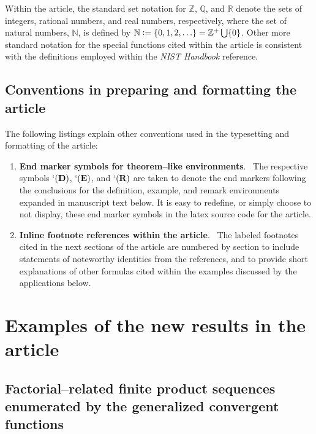 \documentclass[12pt,reqno]{article}
\numberwithin{sfootnote}{section}
\numberwithin{equation}{section}
\renewcommand{\labelenumi}{\textbf{\arabic{enumi}.}}
\renewcommand{\labelenumi}{$\mathsmaller{\blacktriangleright}$ }
\theoremstyle{DefaultTheoremStyle}
\theoremstyle{definition}
\newcommand{\DefinitionQEDSymbol}{`(\text{\rm{\bf D}})}
\newcommand{\RemarkQEDSymbol}{`(\text{\rm{\bf R}})}
\newcommand{\ExampleQEDSymbol}{`(\text{\rm{\bf E}})}
\newcommand{\defequals}{\ensuremath{\vcentcolon=}}
\begin{document}
Within the article, the standard set notation for 
$\mathbb{Z}$, $\mathbb{Q}$, and $\mathbb{R}$ 
denote the sets of integers, rational numbers, and real numbers, respectively, 
where the set of natural numbers, $\mathbb{N}$, is defined by 
$\mathbb{N} \defequals \{0, 1, 2, \ldots \} = \mathbb{Z}^{+} \bigcup \{0\}$. 
Other more standard notation for the special functions 
cited within the article is consistent with the definitions 
employed within the \emph{NIST Handbook} reference. 

\subsection{Conventions in preparing and formatting the article} 

The following listings explain other conventions used in the 
typesetting and formatting of the article: 
\begin{enumerate} 
     \renewcommand{\labelenumi}{$\mathsmaller{\blacktriangleright}$ } 
     \setlength{\itemsep}{-1mm} 
     \newcommand{\localitemlabel}[1]{\textbf{#1}.\ } 

\item \localitemlabel{End marker symbols for theorem--like environments} 
The respective symbols 
$\DefinitionQEDSymbol$, $\ExampleQEDSymbol$, and $\RemarkQEDSymbol$ 
are taken to denote the 
end markers following the conclusions for the 
definition, example, and remark environments expanded 
in manuscript text below. 
It is easy to redefine, or simply choose to not display, 
these end marker symbols in the latex source code for the article. 

\item \localitemlabel{Inline footnote references within the article} 
The labeled footnotes cited in the next sections of the article 
are numbered by section to include statements of noteworthy identities 
from the references, and to provide short explanations of other 
formulas cited within the examples discussed by the applications below. 

\end{enumerate} 

\section{Examples of the new results in the article} 
\label{subSection_Intro_Examples} 

\subsection{Factorial--related finite product sequences 
            enumerated by the 
            generalized convergent functions} 
\label{subsubSection_Intro_Examples_Fact-RelatedSeqs_GenByTheConvFns} 
\label{prop_Conv-Based_Defs_for_FactFn_Variants} 
\label{cor_NumericalMultiFactSeqsEnum_Alpha1234} 
\end{document}
